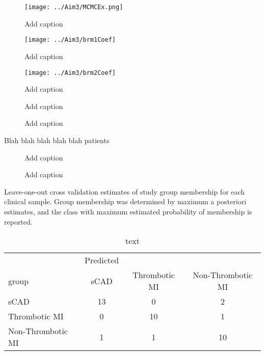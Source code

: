 \newpage
{}
\recalctypearea
\begin{figure}[H]
	\texttt{[image: ../Aim3/MCMCEx.png]}
	\caption[Add caption]{Add caption \label{fig:brm1Coef} }
\end{figure}
\newpage
\begin{figure}[H]
	\texttt{[image: ../Aim3/brm1Coef]}
	\caption[Add caption]{Add caption \label{fig:brm1Coef} }
\end{figure}
\newpage
\begin{figure}[H]
	\texttt{[image: ../Aim3/brm2Coef]}
	\caption[Add caption]{Add caption \label{fig:brm2Coef} }
\end{figure}
\newpage
{}
\recalctypearea

\begin{figure}[H]
	\caption[Add caption]{Add caption \label{fig:coefPost} }
\end{figure}

\begin{figure}[H]
	\caption[Add caption]{Add caption \label{fig:coefPost2} }
\end{figure}

Blah blah blah blah blah patients

\begin{figure}[H]
	\caption[Add caption]{Add caption \label{fig:ptid2010MCMC} }
\end{figure}

\begin{figure}[H]
	\caption[Add caption]{Add caption \label{fig:ptid2010Hist} }
\end{figure}
 
Leave-one-out cross validation estimates of study group membership for each clinical sample. Group membership was determined by maximum a posteriori estimates, and the class with maximum estimated probability of membership is reported.
 
 \begin{table}[H]
 	\caption{text}
 	\label{tab:modelRes}
 	\centering
 	\begin{tabular}{l|ccc}
 		& Predicted & & \\
 		group  &     sCAD & Thrombotic MI & Non-Thrombotic MI \\
 		\hline
 		sCAD   &     13    &     0    &     2\\
 		Thrombotic MI  &  0    &    10    &     1\\
 		Non-Thrombotic MI &   1    &     1   &     10
 	\end{tabular}
 \end{table}